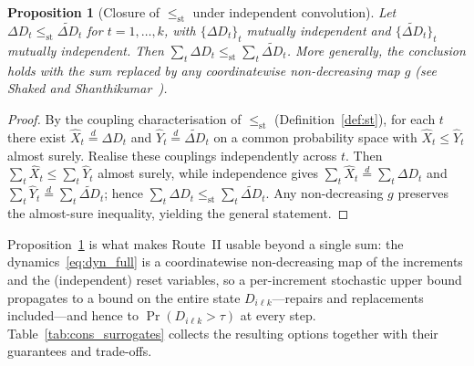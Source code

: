 \documentclass[11pt,a4paper]{article}
\theoremstyle{plain}
\newtheorem{proposition}[theorem]{Proposition}
\theoremstyle{definition}
\theoremstyle{remark}
\begin{document}
\begin{proposition}[Closure of $\le_{\mathrm{st}}$ under independent convolution]\label{prop:st_closure}
Let $\Delta D_t \le_{\mathrm{st}} \widetilde{\Delta D}_t$ for $t = 1,\dots,k$, with $\{\Delta D_t\}_t$ mutually independent and $\{\widetilde{\Delta D}_t\}_t$ mutually independent.
Then $\sum_t \Delta D_t \le_{\mathrm{st}} \sum_t \widetilde{\Delta D}_t$.
More generally, the conclusion holds with the sum replaced by any coordinatewise non-decreasing map $g$ (see Shaked and Shanthikumar~\cite[\S1.A]{ShakedShanthikumar2007}).
\end{proposition}
\begin{proof}
By the coupling characterisation of $\le_{\mathrm{st}}$ (Definition~\ref{def:st}), for each $t$ there exist $\hat X_t \stackrel{d}{=} \Delta D_t$ and $\hat Y_t \stackrel{d}{=} \widetilde{\Delta D}_t$ on a common probability space with $\hat X_t \le \hat Y_t$ almost surely.
Realise these couplings independently across $t$.
Then $\sum_t \hat X_t \le \sum_t \hat Y_t$ almost surely, while independence gives $\sum_t \hat X_t \stackrel{d}{=} \sum_t \Delta D_t$ and $\sum_t \hat Y_t \stackrel{d}{=} \sum_t \widetilde{\Delta D}_t$; hence $\sum_t \Delta D_t \le_{\mathrm{st}} \sum_t \widetilde{\Delta D}_t$.
Any non-decreasing $g$ preserves the almost-sure inequality, yielding the general statement.
\end{proof}

Proposition~\ref{prop:st_closure} is what makes Route~II usable beyond a single sum: the dynamics~\eqref{eq:dyn_full} is a coordinatewise non-decreasing map of the increments and the (independent) reset variables, so a per-increment stochastic upper bound propagates to a bound on the entire state $D_{i\ell k}$---repairs and replacements included---and hence to $\Pr(D_{i\ell k} > \tau)$ at every step.
Table~\ref{tab:cons_surrogates} collects the resulting options together with their guarantees and trade-offs.
\end{document}
